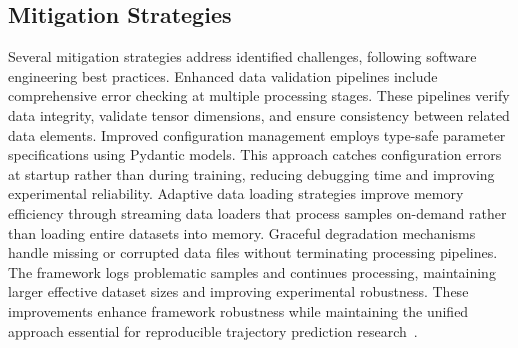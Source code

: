 \subsection{Mitigation Strategies}
\label{ssec:mitigation_strategies}

Several mitigation strategies address identified challenges, following software engineering best practices. Enhanced data validation pipelines include comprehensive error checking at multiple processing stages. These pipelines verify data integrity, validate tensor dimensions, and ensure consistency between related data elements.
Improved configuration management employs type-safe parameter specifications using Pydantic models. This approach catches configuration errors at startup rather than during training, reducing debugging time and improving experimental reliability. Adaptive data loading strategies improve memory efficiency through streaming data loaders that process samples on-demand rather than loading entire datasets into memory.
Graceful degradation mechanisms handle missing or corrupted data files without terminating processing pipelines. The framework logs problematic samples and continues processing, maintaining larger effective dataset sizes and improving experimental robustness. These improvements enhance framework robustness while maintaining the unified approach essential for reproducible trajectory prediction research~\cite{unitrajFeng2024, scenarionetLi2023}.

